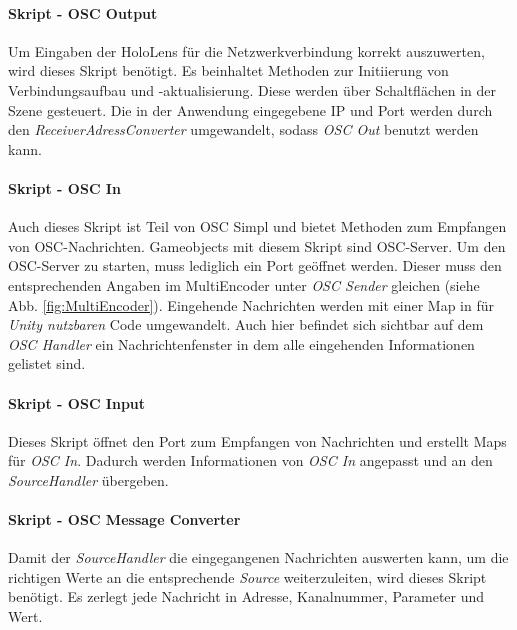 \documentclass[11pt, titlepage, fleqn]{report}
\begin{document}
                    \paragraph{Skript - OSC Output} 
                    Um Eingaben der HoloLens für die Netzwerkverbindung korrekt 
                    auszuwerten, wird dieses Skript benötigt. 
                    Es beinhaltet Methoden zur Initiierung von 
                    Verbindungsaufbau und -aktualisierung. Diese werden über 
                    Schaltflächen in der Szene gesteuert. Die in der Anwendung eingegebene IP und Port werden durch den 
                    \textit{ReceiverAdressConverter} umgewandelt, sodass 
                    \textit{OSC Out} benutzt werden kann.
                    \paragraph{Skript - OSC In}     
                    Auch dieses Skript ist Teil von OSC Simpl und bietet 
                    Methoden zum Empfangen von OSC-Nachrichten. 
                    Gameobjects mit diesem Skript sind OSC-Server. Um den 
                    OSC-Server zu starten, muss lediglich ein 
                    Port geöffnet werden. Dieser muss den entsprechenden Angaben im MultiEncoder unter \textit{OSC Sender} 
                    gleichen (siehe Abb. \ref{fig:MultiEncoder}). Eingehende Nachrichten werden mit einer Map in für \textit{Unity nutzbaren} Code 
                    umgewandelt. 
                    Auch hier befindet sich sichtbar auf dem \textit{OSC Handler} ein Nachrichtenfenster in dem alle eingehenden 
                    Informationen gelistet sind.
                    \paragraph{Skript - OSC Input}
                    Dieses Skript öffnet den Port zum Empfangen von Nachrichten und erstellt Maps für \textit{OSC In}. Dadurch werden 
                    Informationen von \textit{OSC In} angepasst und an den \textit{SourceHandler} übergeben.
                    \paragraph{Skript - OSC Message Converter}
                    Damit der \textit{SourceHandler} die eingegangenen 
                    Nachrichten auswerten kann, um die richtigen Werte an die 
                    entsprechende \textit{Source} weiterzuleiten, wird dieses 
                    Skript benötigt. Es zerlegt jede Nachricht in Adresse, 
                    Kanalnummer, Parameter und Wert.
\end{document}
